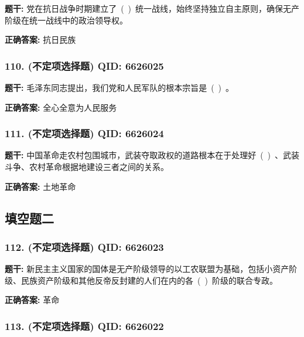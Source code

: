 \documentclass[12pt,UTF8]{ctexart}
\begin{document}
\textbf{题干:}
党在抗日战争时期建立了 ( ) 统一战线，始终坚持独立自主原则，确保无产阶级在统一战线中的政治领导权。

\textbf{正确答案:}
抗日民族

\vspace{0.3em}\hrulefill\vspace{0.7em}

\subsubsection*{110. (不定项选择题) \small QID: 6626025}

\textbf{题干:}
毛泽东同志提出，我们党和人民军队的根本宗旨是 ( ) 。

\textbf{正确答案:}
全心全意为人民服务

\vspace{0.3em}\hrulefill\vspace{0.7em}

\subsubsection*{111. (不定项选择题) \small QID: 6626024}

\textbf{题干:}
中国革命走农村包围城市，武装夺取政权的道路根本在于处理好 ( ) 、武装斗争、农村革命根据地建设三者之间的关系。

\textbf{正确答案:}
土地革命

\vspace{0.3em}\hrulefill\vspace{0.7em}

\subsection*{填空题二}

\subsubsection*{112. (不定项选择题) \small QID: 6626023}

\textbf{题干:}
新民主主义国家的国体是无产阶级领导的以工农联盟为基础，包括小资产阶级、民族资产阶级和其他反帝反封建的人们在内的各 ( ) 阶级的联合专政。

\textbf{正确答案:}
革命

\vspace{0.3em}\hrulefill\vspace{0.7em}

\subsubsection*{113. (不定项选择题) \small QID: 6626022}
\end{document}
